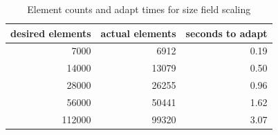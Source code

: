 \begin{table}
\caption{Element counts and adapt times for size field scaling}
\label{tab:scale}
\begin{center}
\begin{tabular}{r|r|r}
desired elements & actual elements & seconds to adapt \\ \hline
7000   & 6912  & 0.19 \\
14000  & 13079 & 0.50 \\
28000  & 26255 & 0.96 \\
56000  & 50441 & 1.62 \\
112000 & 99320 & 3.07 \\
\end{tabular}
\end{center}
\end{table}



